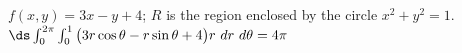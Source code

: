 {$f(x,y) = 3x-y+4$; $R$ is the region enclosed by the circle $x^2+y^2=1$.
}
{$\ds \int_0^{2\pi}\int_0^1 \big(3r\cos\theta-r\sin\theta+4\big)r\ dr\ d\theta = 4\pi$
}